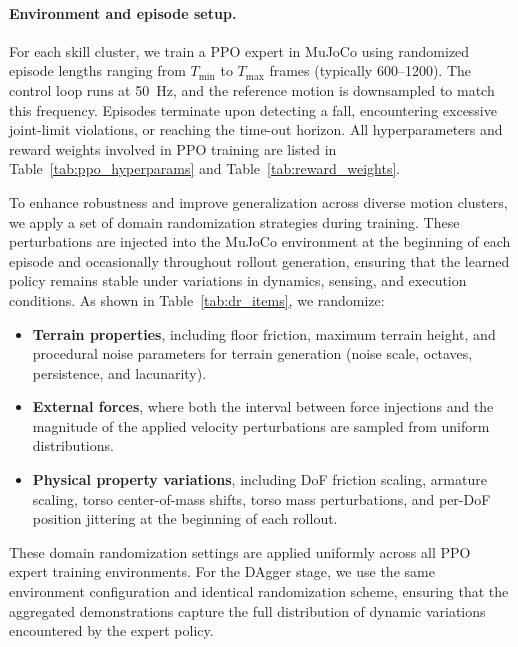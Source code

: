 \paragraph{Environment and episode setup.}
For each skill cluster, we train a PPO expert in MuJoCo using randomized episode lengths ranging from $T_{\min}$ to $T_{\max}$ frames (typically 600--1200). The control loop runs at 50~Hz, and the reference motion is downsampled to match this frequency. Episodes terminate upon detecting a fall, encountering excessive joint-limit violations, or reaching the time-out horizon. All hyperparameters and reward weights involved in PPO training are listed in Table~\ref{tab:ppo_hyperparams} and Table~\ref{tab:reward_weights}.

To enhance robustness and improve generalization across diverse motion clusters, we apply a set of domain randomization strategies during training. These perturbations are injected into the MuJoCo environment at the beginning of each episode and occasionally throughout rollout generation, ensuring that the learned policy remains stable under variations in dynamics, sensing, and execution conditions. As shown in Table~\ref{tab:dr_items}, we randomize:

\begin{itemize}[leftmargin=1.5em]
\item \textbf{Terrain properties}, including floor friction, maximum terrain height, and procedural noise parameters for terrain generation (noise scale, octaves, persistence, and lacunarity).

\item \textbf{External forces}, where both the interval between force injections and the magnitude of the applied velocity perturbations are sampled from uniform distributions.

\item \textbf{Physical property variations}, including DoF friction scaling, armature scaling, torso center-of-mass shifts, torso mass perturbations, and per-DoF position jittering at the beginning of each rollout.

\end{itemize}

These domain randomization settings are applied uniformly across all PPO expert training environments. For the DAgger stage, we use the same environment configuration and identical randomization scheme, ensuring that the aggregated demonstrations capture the full distribution of dynamic variations encountered by the expert policy.

